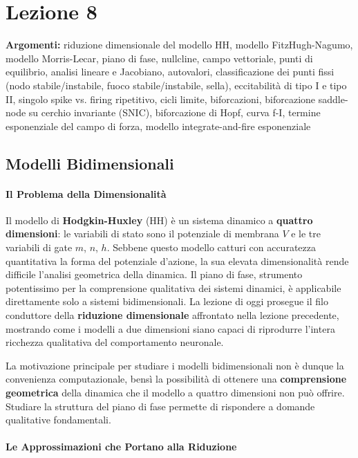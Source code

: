 \chapter{Lezione 8}


\textbf{Argomenti:} riduzione dimensionale del modello HH, modello FitzHugh-Nagumo, modello Morris-Lecar, piano di fase, nullcline, campo vettoriale, punti di equilibrio, analisi lineare e Jacobiano, autovalori, classificazione dei punti fissi (nodo stabile/instabile, fuoco stabile/instabile, sella), eccitabilità di tipo I e tipo II, singolo spike vs. firing ripetitivo, cicli limite, biforcazioni, biforcazione saddle-node su cerchio invariante (SNIC), biforcazione di Hopf, curva f-I, termine esponenziale del campo di forza, modello integrate-and-fire esponenziale


\section{Modelli Bidimensionali}

\subsubsection{Il Problema della Dimensionalità}

Il modello di \textbf{Hodgkin-Huxley} (HH) è un sistema dinamico a \textbf{quattro dimensioni}: le variabili di stato sono il potenziale di membrana $V$ e le tre variabili di gate $m$, $n$, $h$. Sebbene questo modello catturi con accuratezza quantitativa la forma del potenziale d'azione, la sua elevata dimensionalità rende difficile l'analisi geometrica della dinamica. Il piano di fase, strumento potentissimo per la comprensione qualitativa dei sistemi dinamici, è applicabile direttamente solo a sistemi bidimensionali. La lezione di oggi prosegue il filo conduttore della \textbf{riduzione dimensionale} affrontato nella lezione precedente, mostrando come i modelli a due dimensioni siano capaci di riprodurre l'intera ricchezza qualitativa del comportamento neuronale.


La motivazione principale per studiare i modelli bidimensionali non è dunque la convenienza computazionale, bensì la possibilità di ottenere una \textbf{comprensione geometrica} della dinamica che il modello a quattro dimensioni non può offrire. Studiare la struttura del piano di fase permette di rispondere a domande qualitative fondamentali.

\subsubsection{Le Approssimazioni che Portano alla Riduzione}

